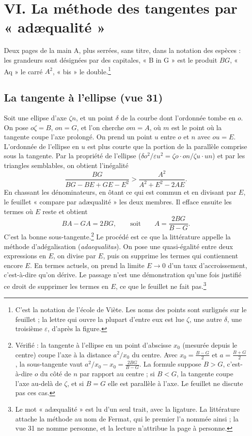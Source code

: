\documentclass[11pt,a4paper]{article}
\begin{document}
\section*{VI. La méthode des tangentes par « adæqualité »}

Deux pages de la main A, plus serrées, sans titre, dans la notation des
espèces : les grandeurs sont désignées par des capitales, « B in G » est le
produit \(BG\), « Aq » le carré \(A^2\), « bis » le double.\footnote{C'est la
notation de l'école de Viète. Les noms des points sont surlignés sur le
feuillet ; la lettre qui ouvre la plupart d'entre eux est lue \(\zeta\), une
autre \(\delta\), une troisième \(\varepsilon\), d'après la figure.}

\subsection*{La tangente à l'ellipse (vue 31)}

Soit une ellipse d'axe \(\zeta n\), et un point \(\delta\) de la courbe dont
l'ordonnée tombe en \(o\). On pose \(o\zeta=B\), \(on=G\), et l'on cherche
\(om=A\), où \(m\) est le point où la tangente coupe l'axe prolongé. On prend un
point \(u\) entre \(o\) et \(n\) avec \(ou=E\). L'ordonnée de l'ellipse en \(u\) est
plus courte que la portion de la parallèle comprise sous la tangente. Par la
propriété de l'ellipse (\(\delta o^2/\varepsilon u^2=\zeta o\cdot on/\zeta
u\cdot un\)) et par les triangles semblables, on obtient l'inégalité
\[
\frac{BG}{BG-BE+GE-E^2}>\frac{A^2}{A^2+E^2-2AE}.
\]
En chassant les dénominateurs, en ôtant ce qui est commun et en divisant par
\(E\), le feuillet « compare par adæqualité » les deux membres. Il efface
ensuite les termes où \(E\) reste et obtient
\[
BA-GA=2BG,\qquad\text{soit}\qquad A=\frac{2BG}{B-G}.
\]
C'est la bonne sous-tangente.\footnote{Vérifié : la tangente à l'ellipse en un
point d'abscisse \(x_0\) (mesurée depuis le centre) coupe l'axe à la distance
\(a^2/x_0\) du centre. Avec \(x_0=\frac{B-G}{2}\) et \(a=\frac{B+G}{2}\), la
sous-tangente vaut \(a^2/x_0-x_0=\frac{2BG}{B-G}\). La formule suppose \(B>G\),
c'est-à-dire \(o\) du côté de \(n\) par rapport au centre ; si \(B<G\), la
tangente coupe l'axe au-delà de \(\zeta\), et si \(B=G\) elle est parallèle à
l'axe. Le feuillet ne discute pas ces cas.} Le procédé est ce que la
littérature appelle la méthode d'adégalisation (\emph{adaequalitas}). On pose
une quasi-égalité entre deux expressions en \(E\), on divise par \(E\), puis on
supprime les termes qui contiennent encore \(E\). En termes actuels, on prend la
limite \(E\to0\) d'un taux d'accroissement, c'est-à-dire qu'on dérive. Le
passage n'est une démonstration qu'une fois justifié ce droit de supprimer les
termes en \(E\), ce que le feuillet ne fait pas.\footnote{Le mot
« adæqualité » est lu d'un seul trait, avec la ligature. La littérature
attache la méthode au nom de Fermat, qui le premier l'a nommée ainsi ; la vue 31
ne nomme personne, et la lecture n'attribue la page à personne.}
\end{document}
